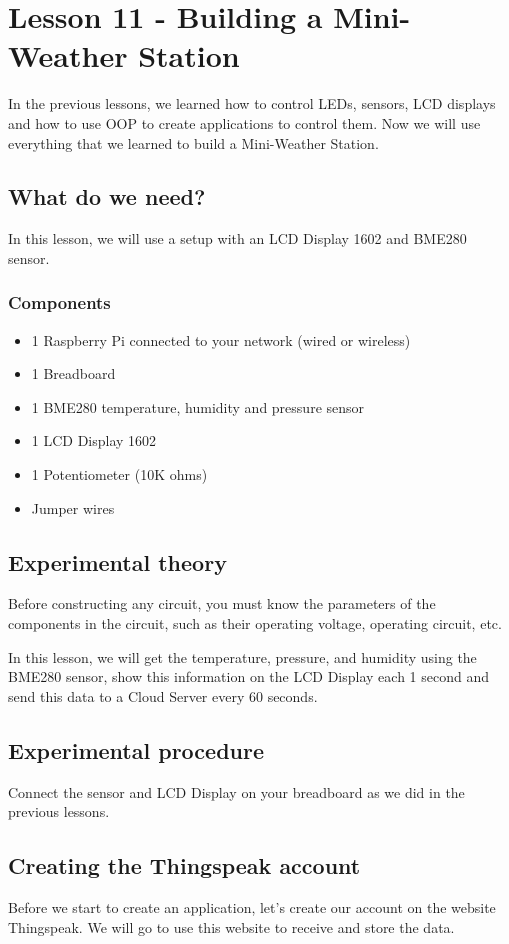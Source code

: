 \documentclass[10pt,twoside,english]{_support/latex/sbabook/sbabook}
\begin{document}
\frontmatter
\pagestyle{plain}

\tableofcontents*
\clearpage\listoffigures

\mainmatter

\chapter{Lesson 11 - Building a Mini-Weather Station}
In the previous lessons, we learned how to control LEDs, sensors, LCD displays and how to use OOP to create applications to control them. Now we will use everything that we learned to build a Mini-Weather Station. 
\section{What do we need?}
In this lesson, we will use a setup with an LCD Display 1602 and BME280 sensor.
\subsection{Components}
\begin{itemize}
\item 1 Raspberry Pi connected to your network (wired or wireless)
\item 1 Breadboard
\item 1 BME280 temperature, humidity and pressure sensor
\item 1 LCD Display 1602 
\item 1 Potentiometer (10K ohms)
\item Jumper wires
\end{itemize}
\section{Experimental theory}
Before constructing any circuit, you must know the parameters of the components in the circuit, such as their operating voltage, operating circuit, etc.

In this lesson, we will get the temperature, pressure, and humidity using the BME280 sensor, show this information on the LCD Display each 1 second and send this data to a Cloud Server every 60 seconds. 
\section{Experimental procedure}
Connect the sensor and LCD Display on your breadboard as we did in the previous lessons. 
\section{Creating the Thingspeak account }
Before we start to create an application, let's create our account on the website Thingspeak. We will go to use this website to receive and store the data.
\end{document}
